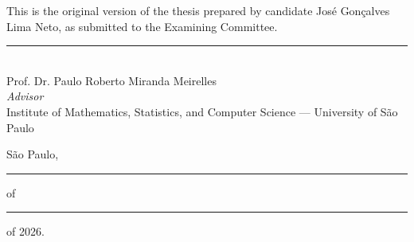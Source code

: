 
\cleardoublepage
\thispagestyle{empty}
\vspace*{\fill}

\noindent This is the original version of the thesis prepared by candidate
José Gonçalves Lima Neto, as submitted to the Examining Committee.

\vspace{3cm}

\begin{center}
    \rule{8cm}{0.4pt}\\[2pt]
    Prof. Dr. Paulo Roberto Miranda Meirelles\\
    \textit{Advisor}\\
    Institute of Mathematics, Statistics, and Computer Science --- University of São Paulo
\end{center}

\vspace{1cm}

\begin{center}
    São Paulo, \rule{1.5cm}{0.4pt} of \rule{3.5cm}{0.4pt} of 2026.
\end{center}

\vspace*{\fill}
\clearpage
